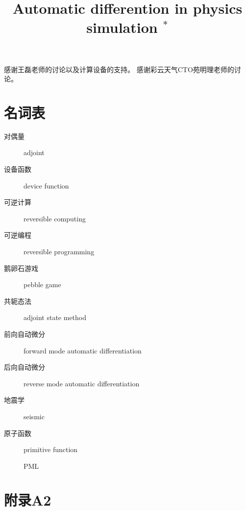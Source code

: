 \documentclass[A4,twoside,fontset=ubuntu,UTF8]{ctexart}
\begin{document}
感谢王磊老师的讨论以及计算设备的支持。
感谢彩云天气CTO苑明理老师的讨论。


\section*{名词表}

\begin{description}
    \item[对偶量] adjoint
    \item[设备函数] device function
    \item[可逆计算] reversible computing
    \item[可逆编程] reversible programming
    \item[鹅卵石游戏] pebble game
    \item[共轭态法] adjoint state method
    \item[前向自动微分] forward mode automatic differentiation
    \item[后向自动微分] reverse mode automatic differentiation
    \item[地震学] seismic
    \item[原子函数] primitive function
    \item[] PML
\end{description}



\section*{附录A2}
%
%
%
%
%

\bigskip




\newpage

\title{Automatic differention in physics simulation $^{\ast}$}%

\end{document}
